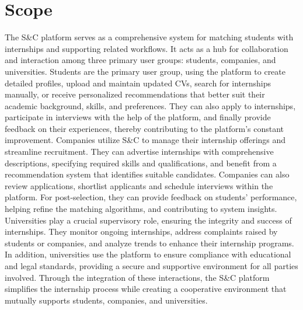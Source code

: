 \section{Scope}
\label{sec:scope}%
The S\&C platform serves as a comprehensive system for matching students with internships and supporting related workflows. It acts as a hub for collaboration and interaction among three primary user groups: students, companies, and universities. Students are the primary user group, using the platform to create detailed profiles, upload and maintain updated CVs, search for internships manually, or receive personalized recommendations that better suit their academic background, skills, and preferences. They can also apply to internships, participate in interviews with the help of the platform, and finally provide feedback on their experiences, thereby contributing to the platform's constant improvement.
Companies utilize S\&C to manage their internship offerings and streamline recruitment. They can advertise internships with comprehensive descriptions, specifying required skills and qualifications, and benefit from a recommendation system that identifies suitable candidates. Companies can also review applications, shortlist applicants and schedule interviews within the platform. For post-selection, they can provide feedback on students' performance, helping refine the matching algorithms, and contributing to system insights.
Universities play a crucial supervisory role, ensuring the integrity and success of internships. They monitor ongoing internships, address complaints raised by students or companies, and analyze trends to enhance their internship programs. In addition, universities use the platform to ensure compliance with educational and legal standards, providing a secure and supportive environment for all parties involved.
Through the integration of these interactions, the S\&C platform simplifies the internship process while creating a cooperative environment that mutually supports students, companies, and universities.

